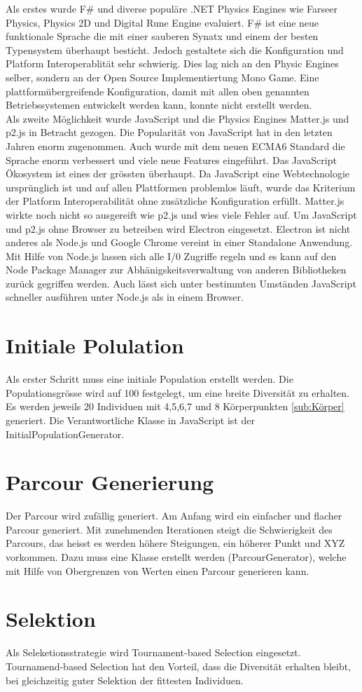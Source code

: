      Als erstes wurde F\# und diverse populäre .NET Physics Engines wie Farseer Physics, Physics 2D und Digital Rune Engine evaluiert.
     F\# ist eine neue funktionale Sprache die mit einer sauberen Synatx und einem der besten Typensystem überhaupt besticht.
     Jedoch gestaltete sich die Konfiguration und Platform Interoperablität sehr schwierig. Dies lag nich an den Physic Engines selber,
     sondern an der Open Source Implementiertung Mono Game. Eine plattformübergreifende Konfiguration,
     damit mit allen oben genannten Betriebssystemen entwickelt werden kann, konnte nicht erstellt werden.\\
     Als zweite Möglichkeit wurde JavaScript und die Physics Engines Matter.js und p2.js in Betracht gezogen.
     Die Popularität von JavaScript hat in den letzten Jahren enorm zugenommen.
     Auch wurde mit dem neuen ECMA6 Standard die Sprache enorm verbessert und viele neue Features eingeführt. Das JavaScript Ökosystem ist eines der grössten überhaupt.
     Da JavaScript eine Webtechnologie ursprünglich ist und auf allen Plattformen problemlos läuft, wurde das Kriterium der Platform Interoperabilität ohne zusätzliche Konfiguration erfüllt.
     Matter.js wirkte noch nicht so ausgereift wie p2.js und wies viele Fehler auf. Um JavaScript und p2.js ohne Browser zu betreiben wird Electron eingesetzt.
     Electron ist nicht anderes als Node.js und Google Chrome vereint in einer Standalone Anwendung.
     Mit Hilfe von Node.js lassen sich alle I/0 Zugriffe regeln und es kann auf den Node Package Manager zur Abhänigskeitsverwaltung von anderen Bibliotheken zurück gegriffen werden.
     Auch lässt sich unter bestimmten Umständen JavaScript schneller ausführen unter Node.js als in einem Browser.

  \section{Initiale Polulation}
  \label{sec:Initiale Polulation}

    Als erster Schritt muss eine initiale Population erstellt werden. Die Populationsgrösse wird auf 100 festgelegt,
    um eine breite Diversität zu erhalten. Es werden jeweils 20 Individuen mit 4,5,6,7 und 8 Körperpunkten
    \ref{sub:Körper} generiert. Die Verantwortliche Klasse in JavaScript ist der InitialPopulationGenerator.


  \section{Parcour Generierung}
  \label{sec:Parcour Generierung}
    Der Parcour wird zufällig generiert. Am Anfang wird ein einfacher und flacher Parcour generiert.
    Mit zunehmenden Iterationen steigt die Schwierigkeit des Parcours, das heisst es werden höhere Steigungen, ein höherer Punkt und XYZ vorkommen.
    Dazu muss eine Klasse erstellt werden (ParcourGenerator), welche mit Hilfe von Obergrenzen von Werten einen Parcour generieren kann.
  \section{Selektion}
  \label{sec:Selektion}

    Als Seleketionsstrategie wird Tournament-based Selection eingesetzt. Tournamend-based Selection hat den Vorteil,
    dass die Diversität erhalten bleibt, bei gleichzeitig guter Selektion der fittesten Individuen.
